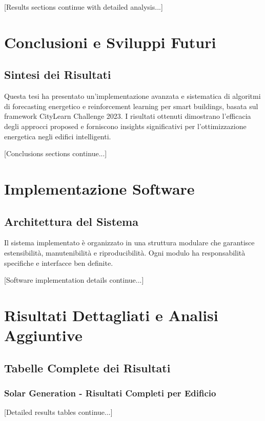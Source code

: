 \documentclass[12pt,a4paper,twoside]{report}
\begin{document}
[Results sections continue with detailed analysis...]


\chapter{Conclusioni e Sviluppi Futuri}

\section{Sintesi dei Risultati}

Questa tesi ha presentato un'implementazione avanzata e sistematica di algoritmi di forecasting energetico e reinforcement learning per smart buildings, basata sul framework CityLearn Challenge 2023. I risultati ottenuti dimostrano l'efficacia degli approcci proposed e forniscono insights significativi per l'ottimizzazione energetica negli edifici intelligenti.

[Conclusions sections continue...]

\begin{appendices}


\chapter{Implementazione Software}

\section{Architettura del Sistema}

Il sistema implementato è organizzato in una struttura modulare che garantisce estensibilità, manutenibilità e riproducibilità. Ogni modulo ha responsabilità specifiche e interfacce ben definite.

[Software implementation details continue...]


\chapter{Risultati Dettagliati e Analisi Aggiuntive}

\section{Tabelle Complete dei Risultati}

\subsection{Solar Generation - Risultati Completi per Edificio}

[Detailed results tables continue...]

\end{appendices}
\end{document}
